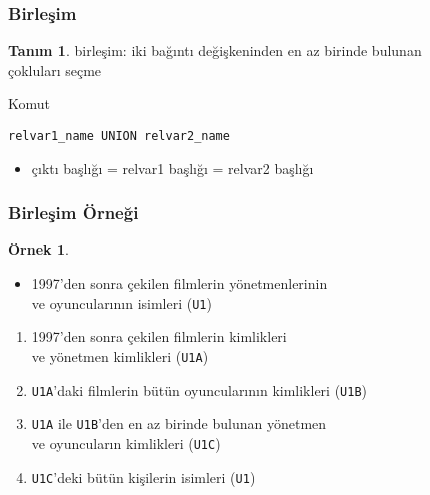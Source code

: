 \documentclass[dvipsnames]{beamer}
\theoremstyle{definition}
\newtheorem{tanim}[theorem]{Tanım}
\theoremstyle{example}
\newtheorem{ornek}[theorem]{Örnek}
\theoremstyle{plain}
\begin{document}
\begin{frame}[fragile]
  \frametitle{Birleşim}

  \begin{tanim}
    \alert{birleşim}: iki bağıntı değişkeninden en az birinde bulunan\\
      çokluları seçme
  \end{tanim}

  \pause
  \begin{block}{Komut}
    \begin{lstlisting}
relvar1_name UNION relvar2_name
    \end{lstlisting}
  \end{block}

  \pause
  \begin{itemize}
    \item çıktı başlığı = relvar1 başlığı = relvar2 başlığı
  \end{itemize}
\end{frame}

\begin{frame}
  \frametitle{Birleşim Örneği}

  \begin{ornek}
    \begin{itemize}
      \item 1997'den sonra çekilen filmlerin yönetmenlerinin\\
        ve oyuncularının isimleri (\texttt{U1})
    \end{itemize}

    \pause
    \begin{enumerate}
      \item 1997'den sonra çekilen filmlerin kimlikleri\\
        ve yönetmen kimlikleri (\texttt{U1A})

      \pause
      \item \texttt{U1A}'daki filmlerin bütün oyuncularının kimlikleri (\texttt{U1B})

      \pause
      \item \texttt{U1A} ile \texttt{U1B}'den en az birinde bulunan yönetmen\\
        ve oyuncuların kimlikleri (\texttt{U1C})

      \pause
      \item \texttt{U1C}'deki bütün kişilerin isimleri (\texttt{U1})
    \end{enumerate}
  \end{ornek}
\end{frame}
\end{document}
